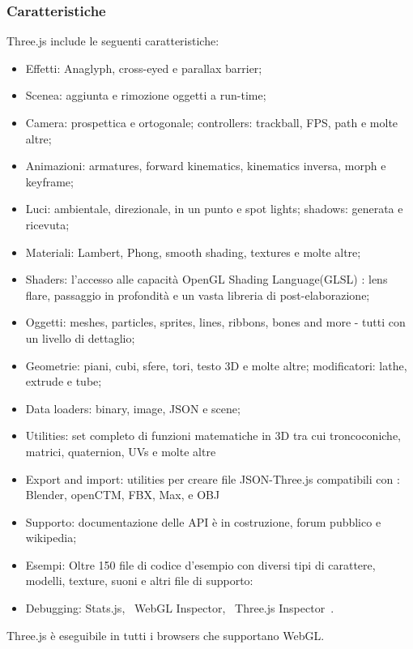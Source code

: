 
\subsubsection{Caratteristiche}
Three.js include le seguenti caratteristiche:~\cite{mrdoob}
\begin{itemize}

\item Effetti: Anaglyph, cross-eyed e parallax barrier;
\item Scenea: aggiunta e rimozione oggetti a run-time;
\item Camera: prospettica e ortogonale; controllers: trackball, FPS, path e molte altre;
\item Animazioni: armatures, forward kinematics, kinematics inversa, morph e keyframe;
\item Luci: ambientale, direzionale, in un punto e spot lights; shadows: generata e ricevuta;
\item Materiali: Lambert, Phong, smooth shading, textures e molte altre;
\item Shaders: l'accesso alle capacità OpenGL Shading Language(GLSL) : lens flare, passaggio in profondità e un vasta libreria di post-elaborazione;
\item Oggetti: meshes, particles, sprites, lines, ribbons, bones and more - tutti con un livello di dettaglio;
\item Geometrie: piani, cubi, sfere, tori, testo 3D e molte altre; modificatori: lathe, extrude e tube;
\item Data loaders: binary, image, JSON e scene;
\item Utilities: set completo di funzioni matematiche in 3D tra cui troncoconiche, matrici, quaternion, UVs e molte altre
\item Export and import: utilities per creare file JSON-Three.js compatibili con : Blender, openCTM, FBX, Max, e OBJ
\item Supporto: documentazione delle API è in costruzione, forum pubblico e wikipedia;
\item Esempi: Oltre 150 file di codice d'esempio con diversi tipi di carattere, modelli, texture, suoni e altri file di supporto:
\item Debugging: Stats.js,~\cite{stats.js} WebGL Inspector,~\cite{webglinspector} Three.js Inspector~\cite{threejsinspector}.
\end{itemize}

Three.js è eseguibile in tutti i browsers che supportano WebGL.
